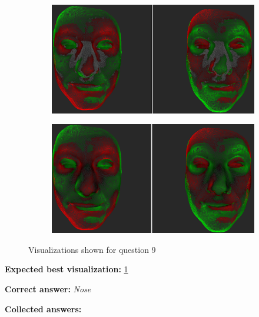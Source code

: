 \begin{figure}[h]
\begin{subfigure}{0.49\textwidth}
\includegraphics[width=\textwidth]{./screenshots/pair23.PNG}
\caption{}
\label{fig:study-8-23}
\end{subfigure}
\begin{subfigure}{0.49\textwidth}
\includegraphics[width=\textwidth]{./screenshots/pair20.PNG}
\caption{}
\label{fig:study-8-20}
\end{subfigure}
\caption{Visualizations shown for question 9}
\end{figure}
\medskip

{\bf Expected best visualization:} \ref{fig:study-8-23}
\medskip

{\bf Correct answer:} {\it Nose}
\medskip

{\bf Collected answers:}

